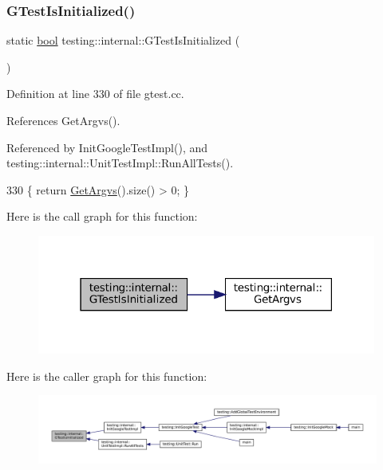 \subsubsection{\texorpdfstring{G\+Test\+Is\+Initialized()}{GTestIsInitialized()}}
{\footnotesize\ttfamily static \hyperlink{classbool}{bool} testing\+::internal\+::\+G\+Test\+Is\+Initialized (\begin{DoxyParamCaption}{ }\end{DoxyParamCaption})\hspace{0.3cm}{\ttfamily [static]}}



Definition at line 330 of file gtest.\+cc.



References Get\+Argvs().



Referenced by Init\+Google\+Test\+Impl(), and testing\+::internal\+::\+Unit\+Test\+Impl\+::\+Run\+All\+Tests().


\begin{DoxyCode}
330 \{ \textcolor{keywordflow}{return} \hyperlink{namespacetesting_1_1internal_a344160f771a3b754fa4e54b6e9846b23}{GetArgvs}().size() > 0; \}
\end{DoxyCode}
Here is the call graph for this function\+:
\nopagebreak
\begin{figure}[H]
\begin{center}
\leavevmode
\includegraphics[width=316pt]{namespacetesting_1_1internal_a91e707e0d371fae0224ffd37f0d042af_cgraph}
\end{center}
\end{figure}
Here is the caller graph for this function\+:
\nopagebreak
\begin{figure}[H]
\begin{center}
\leavevmode
\includegraphics[width=350pt]{namespacetesting_1_1internal_a91e707e0d371fae0224ffd37f0d042af_icgraph}
\end{center}
\end{figure}
\mbox{\label{namespacetesting_1_1internal_addb2ed165b92b74e25fe9ebe9e46b9f9}} 
